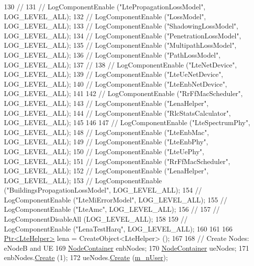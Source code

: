 \begin{DoxyCode}
130 \textcolor{comment}{//}
131 \textcolor{comment}{//   LogComponentEnable ("LtePropagationLossModel", LOG\_LEVEL\_ALL);}
132 \textcolor{comment}{//   LogComponentEnable ("LossModel", LOG\_LEVEL\_ALL);}
133 \textcolor{comment}{//   LogComponentEnable ("ShadowingLossModel", LOG\_LEVEL\_ALL);}
134 \textcolor{comment}{//   LogComponentEnable ("PenetrationLossModel", LOG\_LEVEL\_ALL);}
135 \textcolor{comment}{//   LogComponentEnable ("MultipathLossModel", LOG\_LEVEL\_ALL);}
136 \textcolor{comment}{//   LogComponentEnable ("PathLossModel", LOG\_LEVEL\_ALL);}
137 \textcolor{comment}{//}
138 \textcolor{comment}{//   LogComponentEnable ("LteNetDevice", LOG\_LEVEL\_ALL);}
139 \textcolor{comment}{//   LogComponentEnable ("LteUeNetDevice", LOG\_LEVEL\_ALL);}
140 \textcolor{comment}{//   LogComponentEnable ("LteEnbNetDevice", LOG\_LEVEL\_ALL);}
141 
142 \textcolor{comment}{//   LogComponentEnable ("RrFfMacScheduler", LOG\_LEVEL\_ALL);}
143 \textcolor{comment}{//   LogComponentEnable ("LenaHelper", LOG\_LEVEL\_ALL);}
144 \textcolor{comment}{//   LogComponentEnable ("RlcStatsCalculator", LOG\_LEVEL\_ALL);}
145 
146 
147 \textcolor{comment}{//   LogComponentEnable ("LteSpectrumPhy", LOG\_LEVEL\_ALL);}
148 \textcolor{comment}{//   LogComponentEnable ("LteEnbMac", LOG\_LEVEL\_ALL);}
149 \textcolor{comment}{//   LogComponentEnable ("LteEnbPhy", LOG\_LEVEL\_ALL);}
150 \textcolor{comment}{//   LogComponentEnable ("LteUePhy", LOG\_LEVEL\_ALL);}
151 \textcolor{comment}{//   LogComponentEnable ("RrFfMacScheduler", LOG\_LEVEL\_ALL);}
152 \textcolor{comment}{//   LogComponentEnable ("LenaHelper", LOG\_LEVEL\_ALL);}
153 \textcolor{comment}{//   LogComponentEnable ("BuildingsPropagationLossModel", LOG\_LEVEL\_ALL);}
154 \textcolor{comment}{//   LogComponentEnable ("LteMiErrorModel", LOG\_LEVEL\_ALL);}
155 \textcolor{comment}{//   LogComponentEnable ("LteAmc", LOG\_LEVEL\_ALL);}
156 \textcolor{comment}{//}
157 \textcolor{comment}{//   LogComponentDisableAll (LOG\_LEVEL\_ALL);}
158 
159 \textcolor{comment}{//  LogComponentEnable ("LenaTestHarq", LOG\_LEVEL\_ALL);}
160 
161 
166   \hyperlink{classns3_1_1Ptr}{Ptr<LteHelper>} lena = CreateObject<LteHelper> ();
167 
168   \textcolor{comment}{// Create Nodes: eNodeB and UE}
169   \hyperlink{classns3_1_1NodeContainer}{NodeContainer} enbNodes;
170   \hyperlink{classns3_1_1NodeContainer}{NodeContainer} ueNodes;
171   enbNodes.\hyperlink{classns3_1_1NodeContainer_a787f059e2813e8b951cc6914d11dfe69}{Create} (1);
172   ueNodes.\hyperlink{classns3_1_1NodeContainer_a787f059e2813e8b951cc6914d11dfe69}{Create} (\hyperlink{classLenaHarqTestCase_a63345f1ba9ffc5ab5e8a01ca79d6f0c4}{m\_nUser});

\end{DoxyCode}
